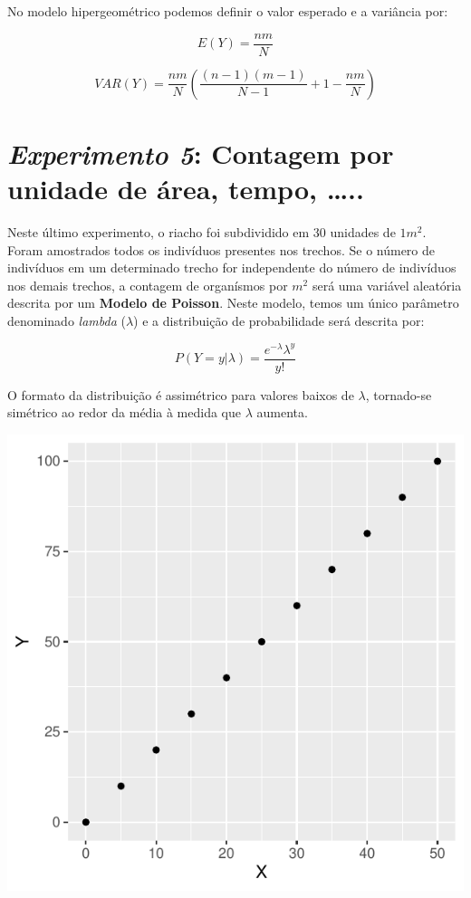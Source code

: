 \documentclass[
]{book}
\begin{document}
No modelo hipergeométrico podemos definir o valor esperado e a variância por:

\[E(Y) = \frac{n m}{N}\]

\[VAR(Y) = \frac{n m}{N}(\frac{(n-1)(m-1)}{N-1}+1-\frac{n m}{N})\]

\hypertarget{experimento-5-contagem-por-unidade-de-uxe1rea-tempo-..}{%
\section{\texorpdfstring{\emph{Experimento 5}: Contagem por unidade de área, tempo, \ldots..}{Experimento 5: Contagem por unidade de área, tempo, \ldots..}}\label{experimento-5-contagem-por-unidade-de-uxe1rea-tempo-..}}

Neste último experimento, o riacho foi subdividido em 30 unidades de \(1m^2\). Foram amostrados todos os indivíduos presentes nos trechos. Se o número de indivíduos em um determinado trecho for independente do número de indivíduos nos demais trechos, a contagem de organísmos por \(m^2\) será uma variável aleatória descrita por um \textbf{Modelo de Poisson}. Neste modelo, temos um único parâmetro denominado \emph{lambda} (\(\lambda\)) e a distribuição de probabilidade será descrita por:

\[P(Y = y|\lambda) =  \frac{e^{-\lambda} \lambda^y}{y!}\]

O formato da distribuição é assimétrico para valores baixos de \(\lambda\), tornado-se simétrico ao redor da média à medida que \(\lambda\) aumenta.

\begin{center}\includegraphics{probest-cambientais_files/figure-latex/unnamed-chunk-210-1} \end{center}
\end{document}
